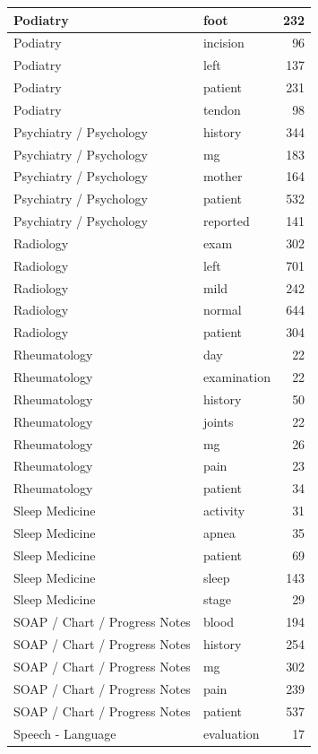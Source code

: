 \documentclass[
]{article}
\begin{document}
\begin{table}
\begin{tabular}{l|l|r}
\hline
Podiatry & foot & 232\\
\hline
Podiatry & incision & 96\\
\hline
Podiatry & left & 137\\
\hline
Podiatry & patient & 231\\
\hline
Podiatry & tendon & 98\\
\hline
Psychiatry / Psychology & history & 344\\
\hline
Psychiatry / Psychology & mg & 183\\
\hline
Psychiatry / Psychology & mother & 164\\
\hline
Psychiatry / Psychology & patient & 532\\
\hline
Psychiatry / Psychology & reported & 141\\
\hline
Radiology & exam & 302\\
\hline
Radiology & left & 701\\
\hline
Radiology & mild & 242\\
\hline
Radiology & normal & 644\\
\hline
Radiology & patient & 304\\
\hline
Rheumatology & day & 22\\
\hline
Rheumatology & examination & 22\\
\hline
Rheumatology & history & 50\\
\hline
Rheumatology & joints & 22\\
\hline
Rheumatology & mg & 26\\
\hline
Rheumatology & pain & 23\\
\hline
Rheumatology & patient & 34\\
\hline
Sleep Medicine & activity & 31\\
\hline
Sleep Medicine & apnea & 35\\
\hline
Sleep Medicine & patient & 69\\
\hline
Sleep Medicine & sleep & 143\\
\hline
Sleep Medicine & stage & 29\\
\hline
SOAP / Chart / Progress Notes & blood & 194\\
\hline
SOAP / Chart / Progress Notes & history & 254\\
\hline
SOAP / Chart / Progress Notes & mg & 302\\
\hline
SOAP / Chart / Progress Notes & pain & 239\\
\hline
SOAP / Chart / Progress Notes & patient & 537\\
\hline
Speech - Language & evaluation & 17\\

\end{tabular}
\end{table}
\end{document}
